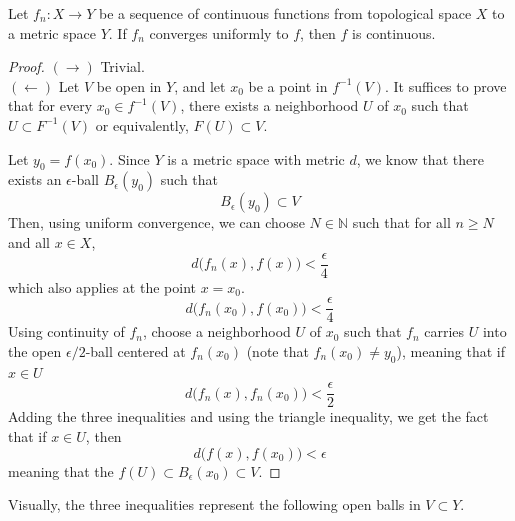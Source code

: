 \documentclass{article}
\begin{document}
  \begin{theorem}
  Let $f_n: X \longrightarrow Y$ be a sequence of continuous functions from topological space $X$ to a metric space $Y$. If $f_n$ converges uniformly to $f$, then $f$ is continuous. 
  \end{theorem}
  \begin{proof}
  $(\rightarrow)$ Trivial. \\
  $(\leftarrow)$ Let $V$ be open in $Y$, and let $x_0$ be a point in $f^{-1} (V)$. It suffices to prove that for every $x_0 \in f^{-1} (V)$, there exists a neighborhood $U$ of $x_0$ such that $U \subset F^{-1} (V)$ or equivalently, $F(U) \subset V$. 

  Let $y_0 = f(x_0)$. Since $Y$ is a metric space with metric $d$, we know that there exists an $\epsilon$-ball $B_\epsilon (y_0)$ such that
  \[B_\epsilon (y_0) \subset V\]
  Then, using uniform convergence, we can choose $N \in \mathbb{N}$ such that for all $n \geq N$ and all $x \in X$, 
  \[d \big( f_n (x), f(x) \big) < \frac{\epsilon}{4}\]
  which also applies at the point $x = x_0$. 
  \[d \big( f_n (x_0), f(x_0) \big) < \frac{\epsilon}{4}\]
  Using continuity of $f_n$, choose a neighborhood $U$ of $x_0$ such that $f_n$ carries $U$ into the open $\epsilon/2$-ball centered at $f_n (x_0)$ (note that $f_n (x_0) \neq y_0$), meaning that if $x \in U$
  \[d \big( f_n (x), f_n (x_0) \big) < \frac{\epsilon}{2}\]
  Adding the three inequalities and using the triangle inequality, we get the fact that if $x \in U$, then 
  \[d \big( f(x), f(x_0) \big) < \epsilon\]
  meaning that the $f(U) \subset B_\epsilon (x_0) \subset V$. 
  \end{proof}

  Visually, the three inequalities represent the following open balls in $V \subset Y$.
  \begin{center}
  \end{center}
\end{document}
